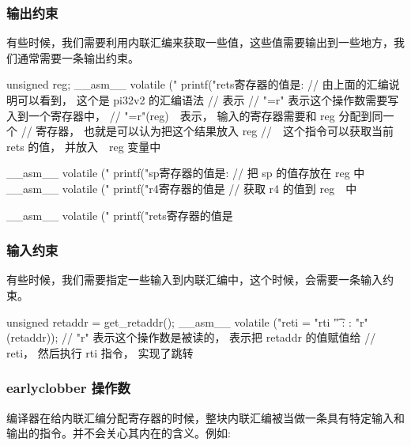 \subsubsection{输出约束}
有些时候，我们需要利用内联汇编来获取一些值，这些值需要输出到一些地方，我们通常需要一条输出约束。
\begin{myccode}
unsigned reg;
__asm__ volatile ("%
printf("rets寄存器的值是: %
// 由上面的汇编说明可以看到， 这个是 pi32v2 的汇编语法
// 表示 %
// "=r" 表示这个操作数需要写入到一个寄存器中，
// "=r"(reg) 表示， 输入的寄存器需要和 reg 分配到同一个
// 寄存器， 也就是可以认为把这个结果放入 reg
// 这个指令可以获取当前 rets 的值， 并放入 reg 变量中

__asm__ volatile ("%
printf("sp寄存器的值是: %
// 把 sp 的值存放在 reg 中
__asm__ volatile ("%
printf("r4寄存器的值是 %
// 获取 r4 的值到 reg 中

__asm__ volatile ("%
printf("rets寄存器的值是 %
\end{myccode}

\subsubsection{输入约束}
有些时候，我们需要指定一些输入到内联汇编中，这个时候，会需要一条输入约束。
\begin{myccode}
unsigned retaddr = get_retaddr();
__asm__ volatile ("reti = %
"rti \n\t" : : "r"(retaddr));
// "r" 表示这个操作数是被读的， 表示把 retaddr 的值赋值给
// reti， 然后执行 rti 指令， 实现了跳转
\end{myccode}


\subsubsection{earlyclobber 操作数}
编译器在给内联汇编分配寄存器的时候，整块内联汇编被当做一条具有特定输入和输出的指令。并不会关心其内在的含义。例如:

